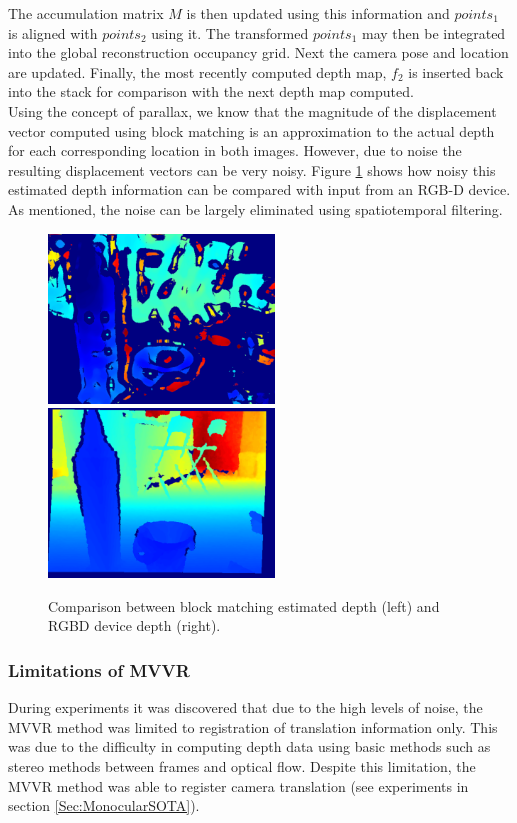 The accumulation matrix $M$ is then updated using this information and $points_1$ is aligned with $points_2$ using it. The transformed $points_1$ may then be integrated into the global reconstruction occupancy grid. Next the camera pose and location are updated. Finally, the most recently computed depth map, $f_2$ is inserted back into the stack for comparison with the next depth map computed. \\ 

Using the concept of parallax, we know that the magnitude of the displacement vector computed using block matching is an approximation to the actual depth for each corresponding location in both images. However, due to noise the resulting displacement vectors can be very noisy. Figure \ref{fig:DepthGenerationExample} shows how noisy this estimated depth information can be compared with input from an RGB-D device. As mentioned, the noise can be largely eliminated using spatiotemporal filtering. \\


\begin{figure}[!htb]
\centering
\includegraphics[width=6cm]{images/methodology/FVR/home_depth_frame_mono}
\includegraphics[width=6cm]{images/methodology/FVR/home_depth_frame}
\caption{Comparison between block matching estimated depth (left) and RGBD device depth (right).}
\label{fig:DepthGenerationExample}
\end{figure}
 
\subsubsection{Limitations of MVVR}

During experiments it was discovered that due to the high levels of noise, the MVVR method was limited to registration of translation information only. This was due to the difficulty in computing depth data using basic methods such as stereo methods between frames and optical flow. Despite this limitation, the MVVR method was able to register camera translation (see experiments in section \ref{Sec:MonocularSOTA}).  